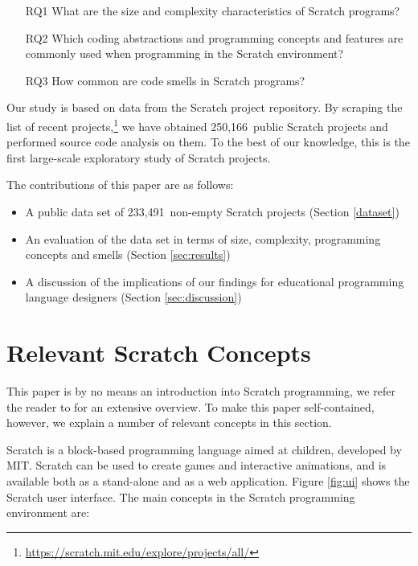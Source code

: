 \documentclass{sig-alternate}
\newcommand{\nPrograms}{250,166}
\newcommand{\nScriptPrograms}{233,491}
\begin{document}
\begin{itemize}
\item[RQ1] What are the size and complexity characteristics of Scratch programs?
\item[RQ2] Which coding abstractions and programming concepts and features are commonly used when programming in the Scratch environment?
\item[RQ3] How common are code smells in Scratch programs?
\end{itemize}

Our study is based on data from the Scratch project repository. By scraping the list of recent projects,\footnote{\label{scratchpublic}\url{https://scratch.mit.edu/explore/projects/all/}} we have obtained \nPrograms~public Scratch projects and performed source code analysis on them. To the best of our knowledge, this is the first large-scale exploratory study of Scratch projects.

The contributions of this paper are as follows:

\begin{itemize}
	\item{A public data set of \nScriptPrograms~non-empty Scratch projects (Section \ref{dataset})}
	\item{An evaluation of the data set in terms of size, complexity, programming concepts and smells (Section \ref{sec:results})}
	\item{A discussion of the implications of our findings for educational programming language designers (Section \ref{sec:discussion})}
\end{itemize}

\section{Relevant Scratch Concepts}
\label{sec:scratch}
This paper is by no means an introduction into Scratch programming, we refer the reader to \cite{brennan_creative_2014} for an extensive overview. To make this paper self-contained, however, we explain a number of relevant concepts in this section. 

Scratch is a block-based programming language aimed at children, developed by MIT. Scratch can be used to create games and interactive animations, and is available both as a stand-alone and as a web application. Figure \ref{fig:ui} shows the Scratch user interface. The main concepts in the Scratch programming environment are:
\end{document}
